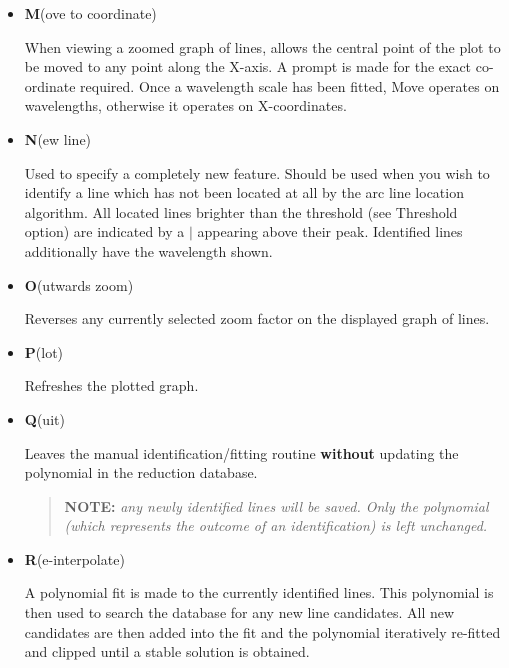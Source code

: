 \documentclass[twoside,11pt,nolof]{starlink}
\newcommand{\sunspec}[2]{#2}
\newcommand{\myindex}[1]{\index{#1}}
\begin{document}
\begin{itemize}
\begin{itemize}
      \item {\sunspec{\Large\tt}{\bf} M}(ove to coordinate)

            When viewing a zoomed graph
            of lines, allows the central point of the plot to be moved to
            any point along the X-axis. A prompt is made for the exact
            co-ordinate required. Once a wavelength scale has been fitted,
            Move operates on wavelengths, otherwise it operates on
            X-coordinates.

      \item {\sunspec{\Large\tt}{\bf} N}(ew line)
            \myindex{Arc fitting!new line}

            Used to specify a completely new
            feature. Should be used when you wish to identify a line which
            has not been located at all by the arc line location algorithm.
            All located lines brighter than the threshold (see Threshold
            option) are indicated by a \(\mid\) appearing above their peak.
            Identified lines additionally have the wavelength shown.

      \item {\sunspec{\Large\tt}{\bf} O}(utwards zoom)

            Reverses any currently selected
            zoom factor on the displayed graph of lines.

      \item {\sunspec{\Large\tt}{\bf} P}(lot)

            Refreshes the plotted graph.

      \item {\sunspec{\Large\tt}{\bf} Q}(uit)

            Leaves the manual identification/fitting
            routine {\bf without} updating the polynomial in the reduction
            database.

            \begin{quote}

               {\bf NOTE:} {\sl any newly identified lines will be saved.
               Only the polynomial (which represents the outcome of an
               identification) is left unchanged.}

            \end{quote}

      \item {\sunspec{\Large\tt}{\bf} R}(e-interpolate)

            A polynomial fit is made to the
            currently identified lines. This polynomial is then used to
            search the database for any new line candidates. All new
            candidates are then added into the fit and the polynomial
            iteratively re-fitted and clipped until a stable solution is
            obtained.


\end{itemize}
\end{itemize}
\end{document}
